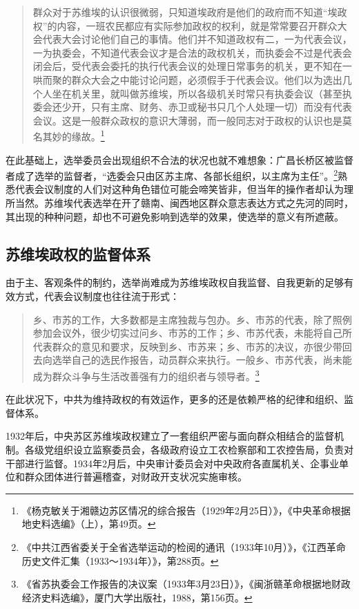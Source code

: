 \begin{quote}

群众对于苏维埃的认识很微弱，只知道埃政府是他们的政府而不知道“埃政权”的内容，一班农民都应有实际参加政权的权利，就是常常要召开群众大会代表大会讨论他们自己的事情。他们并不知道政权有二，一为代表会议，一为执委会，不知道代表会议才是合法的政权机关，而执委会不过是代表会闭会后，受代表会委托的执行代表会议的处理日常事务的机关，更不知在一哄而聚的群众大会之中能讨论问题，必须假手于代表会议。他们以为选出几个人坐在机关里，就叫做苏维埃，所以各级机关时常只有执委会议（甚至执委会还少开，只有主席、财务、赤卫或秘书只几个人处理一切）而没有代表会议。这是一般群众政权的意识大薄弱，而一般同志对于政权的认识也是莫名其妙的缘故。\footnote{《杨克敏关于湘赣边苏区情况的综合报告（1929年2月25日）》，《中央革命根据地史料选编》（上），第49页。}
\end{quote}


在此基础上，选举委员会出现组织不合法的状况也就不难想象：广昌长桥区被监督者成了选举的监督者，“选委会只由区苏主席、各部长组织，以主席为主任”。\footnote{《中共江西省委关于全省选举运动的检阅的通讯（1933年10月）》，《江西革命历史文件汇集（1933～1934年）》，第288页。}熟悉代表会议制度的人们对这种角色错位可能会啼笑皆非，但当年的操作者却认为理所当然。苏维埃代表选举在开了赣南、闽西地区群众意志表达方式之先河的同时，其出现的种种问题，却也不可避免影响到选举的效果，使选举的意义有所遮蔽。

\subsection{苏维埃政权的监督体系}


由于主、客观条件的制约，选举尚难成为苏维埃政权自我监督、自我更新的足够有效方式，代表会议制度也往往流于形式：

\begin{quote}

乡、市苏的工作，大多数都是主席独裁与包办。乡、市苏的代表，除了照例参加会议外，很少切实过问乡、市苏的工作；乡、市苏代表，未能将自己所代表群众的意见和要求，反映到乡、市苏来；乡、市苏的决议，亦很少带回去向选举自己的选民作报告，动员群众来执行。一般乡、市苏代表，尚未能成为群众斗争与生活改善强有力的组织者与领导者。\footnote{《省苏执委会工作报告的决议案（1933年3月23日）》，《闽浙赣革命根据地财政经济史料选编》，厦门大学出版社，1988，第156页。}
\end{quote}


在此状况下，中共为维持政权的有效运作，更多的还是依赖严格的纪律和组织、监督体系。


1932年后，中央苏区苏维埃政权建立了一套组织严密与面向群众相结合的监督机制。各级党组织设立监察委员会，各级政府设立工农检察部和工农控告局，负责对干部进行监督。1934年2月后，中央审计委员会对中央政府各直属机关、企事业单位和群众团体进行普遍稽查，对财政开支状况实施审核。


